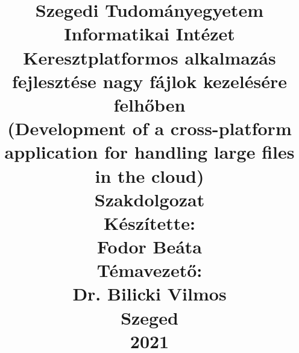 \pagestyle{empty}
\title{
	{\large \textbf {Szegedi Tudományegyetem}}\\
	{\large \textbf {Informatikai Intézet}}\\
	\vspace{3,6cm}
	\textbf {Keresztplatformos alkalmazás fejlesztése nagy fájlok kezelésére felhőben}\\
	{\large (Development of a cross-platform application for handling large files in the cloud)}\\
	\vspace{1,8cm}
	{Szakdolgozat}\\
	\vspace{3,4cm}
	{\small Készítette:}\\
	\textbf {\large Fodor Beáta}\\
	{\small Témavezető:}\\
	\textbf {\large Dr. Bilicki Vilmos}\\
	\vspace{1,8cm}
	{Szeged}\\
	{2021}\\
}
\date{}

\begin{titlepage}

\maketitle

\end{titlepage}